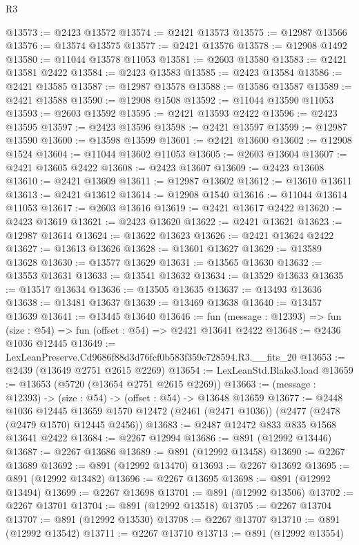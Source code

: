 \begin{lexlean}{R3}
\begin{coremodule}
@13573 := @2423 @13572
@13574 := @2421 @13573
@13575 := @12987 @13566
@13576 := @13574 @13575
@13577 := @2421 @13576
@13578 := @12908 @1492
@13580 := @11044 @13578 @11053
@13581 := @2603 @13580
@13583 := @2421 @13581 @2422
@13584 := @2423 @13583
@13585 := @2423 @13584
@13586 := @2421 @13585
@13587 := @12987 @13578
@13588 := @13586 @13587
@13589 := @2421 @13588
@13590 := @12908 @1508
@13592 := @11044 @13590 @11053
@13593 := @2603 @13592
@13595 := @2421 @13593 @2422
@13596 := @2423 @13595
@13597 := @2423 @13596
@13598 := @2421 @13597
@13599 := @12987 @13590
@13600 := @13598 @13599
@13601 := @2421 @13600
@13602 := @12908 @1524
@13604 := @11044 @13602 @11053
@13605 := @2603 @13604
@13607 := @2421 @13605 @2422
@13608 := @2423 @13607
@13609 := @2423 @13608
@13610 := @2421 @13609
@13611 := @12987 @13602
@13612 := @13610 @13611
@13613 := @2421 @13612
@13614 := @12908 @1540
@13616 := @11044 @13614 @11053
@13617 := @2603 @13616
@13619 := @2421 @13617 @2422
@13620 := @2423 @13619
@13621 := @2423 @13620
@13622 := @2421 @13621
@13623 := @12987 @13614
@13624 := @13622 @13623
@13626 := @2421 @13624 @2422
@13627 := @13613 @13626
@13628 := @13601 @13627
@13629 := @13589 @13628
@13630 := @13577 @13629
@13631 := @13565 @13630
@13632 := @13553 @13631
@13633 := @13541 @13632
@13634 := @13529 @13633
@13635 := @13517 @13634
@13636 := @13505 @13635
@13637 := @13493 @13636
@13638 := @13481 @13637
@13639 := @13469 @13638
@13640 := @13457 @13639
@13641 := @13445 @13640
@13646 := fun (message : @12393) => fun (size : @54) => fun (offset : @54) => @2421 @13641 @2422
@13648 := @2436 @1036 @12445
@13649 := LexLeanPreserve.Cd9686f88d3d76fcf0b583f359c728594.R3.__fits_20
@13653 := @2439 (@13649 @2751 @2615 @2269)
@13654 := LexLeanStd.Blake3.load
@13659 := @13653 (@5720 (@13654 @2751 @2615 @2269))
@13663 := (message : @12393) -> (size : @54) -> (offset : @54) -> @13648 @13659
@13677 := @2448
    @1036
    @12445
    @13659
    @1570
    @12472
    (@2461 (@2471 @1036))
    (@2477 (@2478 (@2479 @1570) @12445 @2456))
@13683 := @2487 @12472 @833 @835 @1568 @13641 @2422
@13684 := @2267 @12994
@13686 := @891 (@12992 @13446)
@13687 := @2267 @13686
@13689 := @891 (@12992 @13458)
@13690 := @2267 @13689
@13692 := @891 (@12992 @13470)
@13693 := @2267 @13692
@13695 := @891 (@12992 @13482)
@13696 := @2267 @13695
@13698 := @891 (@12992 @13494)
@13699 := @2267 @13698
@13701 := @891 (@12992 @13506)
@13702 := @2267 @13701
@13704 := @891 (@12992 @13518)
@13705 := @2267 @13704
@13707 := @891 (@12992 @13530)
@13708 := @2267 @13707
@13710 := @891 (@12992 @13542)
@13711 := @2267 @13710
@13713 := @891 (@12992 @13554)

\end{coremodule}
\end{lexlean}
